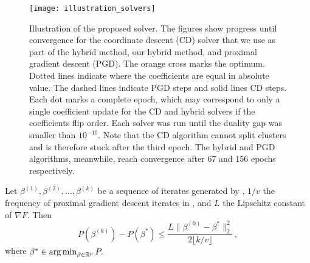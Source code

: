 \begin{figure*}[htb]
  \centering
  \texttt{[image: illustration\_solvers]}
  \caption{Illustration of the proposed solver. The figures show progress
    until convergence for the coordinate descent (CD) solver that we use as part
    of the hybrid method, our hybrid method, and  proximal gradient descent
    (PGD). The orange cross marks the optimum. Dotted lines indicate where the
    coefficients are equal in absolute value. The dashed lines indicate PGD
    steps and solid lines CD steps. Each dot marks a complete epoch, which may
    correspond to only a single coefficient update for the CD and hybrid
    solvers if the coefficients flip order. Each solver was run until the duality
    gap was smaller than \(10^{-10}\). Note that the CD algorithm cannot split clusters
    and is therefore stuck after the third epoch. The hybrid and PGD algorithms,
    meanwhile, reach convergence after 67 and 156 epochs respectively.}
  \label{fig:illustration-solver}
\end{figure*}

\begin{lemma}
  \label{lem:convergence}
  Let \(\beta^{(1)}, \beta^{(2)}, \dots, \beta^{(k)}\) be a sequence of
  iterates generated by , \(1/v\) the frequency of proximal gradient
  descent iterates in , and \(L\) the Lipschitz constant of
  \(\nabla F\). Then
  \[
    P(\beta^{(k)}) - P(\beta^*) \leq \frac{L \lVert \beta^{(0)} - \beta^* \rVert_2^2}{2\lfloor k/v \rfloor }\, ,
  \]
  where \(\beta^* \in \operatorname*{arg\,min}_{\beta \in \mathbb{R}^p} P.\)
\end{lemma}

